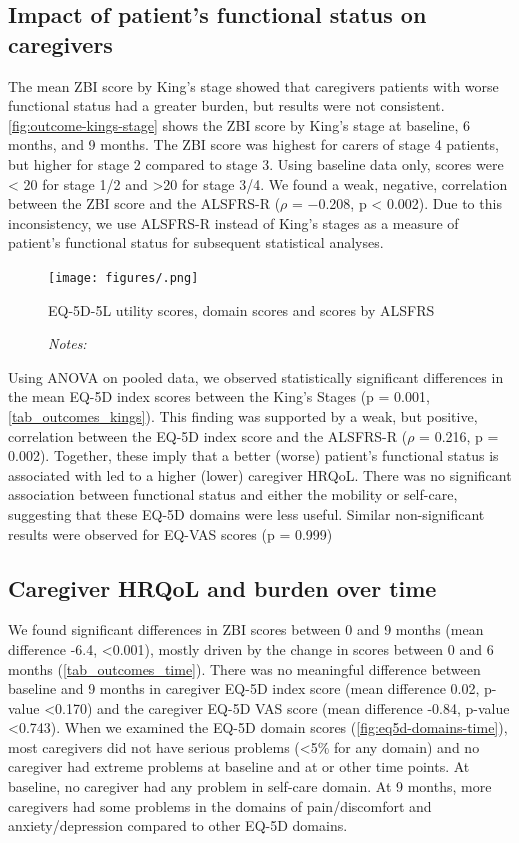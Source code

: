\documentclass[12pt]{article}
\begin{document}
\subsection*{Impact of patient's functional status on caregivers}
The mean ZBI score by King's stage showed that caregivers patients with worse functional status had a greater burden, but results were not consistent. \autoref{fig:outcome-kings-stage} shows the ZBI score by King's stage at baseline, 6 months, and 9 months. The ZBI score was highest for carers of stage 4 patients, but higher for stage 2 compared to stage 3. Using baseline data only, scores were < 20 for stage 1/2 and >20 for stage 3/4. We found a weak, negative, correlation between the ZBI score and the ALSFRS-R ($\rho$ = −0.208, p < 0.002). Due to this inconsistency, we use ALSFRS-R instead of King's stages as a measure of patient's functional status for subsequent statistical analyses.

\begin{figure}[H]
    \centering
    \texttt{[image: figures/.png]}
    \caption{EQ-5D-5L utility scores, domain scores and scores by ALSFRS}
    \label{fig:dummy}
    \caption*{\footnotesize \textit{Notes:} }
\end{figure}

Using ANOVA on pooled data, we observed statistically significant differences in the mean EQ-5D index scores between the King’s Stages (p = 0.001, \autoref{tab_outcomes_kings}). This finding was supported by a weak, but positive, correlation between the EQ-5D index score and the ALSFRS-R ($\rho$ = 0.216, p = 0.002). Together, these imply that a better (worse) patient’s functional status is associated with led to a higher (lower) caregiver HRQoL. There was no significant association between functional status and either the mobility or self-care, suggesting that these EQ-5D domains were less useful. Similar non-significant results were observed for EQ-VAS scores (p = 0.999)

\subsection*{Caregiver HRQoL and burden over time}
We found significant differences in ZBI scores between 0 and 9  months (mean difference -6.4, <0.001), mostly driven by the change in scores between 0 and 6 months (\autoref{tab_outcomes_time}). There was no meaningful difference between baseline and 9 months in caregiver EQ-5D index score (mean difference 0.02, p-value <0.170) and the caregiver EQ-5D VAS score (mean difference -0.84, p-value <0.743). When we examined the EQ-5D domain scores (\autoref{fig:eq5d-domains-time}), most caregivers did not have serious problems (<5\% for any domain) and no caregiver had extreme problems at baseline and at or other time points. At baseline, no caregiver had any problem in self-care domain. At 9 months, more caregivers had some problems in the domains of pain/discomfort and anxiety/depression compared to other EQ-5D domains.
\end{document}

